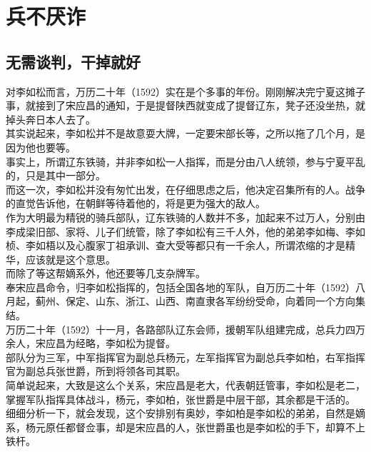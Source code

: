 \section{兵不厌诈}
\ifnum{}
	\begin{multicols}{\theparacolNo}
\fi
\subsection{无需谈判，干掉就好}
对李如松而言，万历二十年（1592）实在是个多事的年份。刚刚解决完宁夏这摊子事，就接到了宋应昌的通知，于是提督陕西就变成了提督辽东，凳子还没坐热，就掉头奔日本人去了。\\

其实说起来，李如松并不是故意耍大牌，一定要宋部长等，之所以拖了几个月，是因为他也要等。\\

事实上，所谓辽东铁骑，并非李如松一人指挥，而是分由八人统领，参与宁夏平乱的，只是其中一部分。\\

而这一次，李如松并没有匆忙出发，在仔细思虑之后，他决定召集所有的人。战争的直觉告诉他，在朝鲜等待着他的，将是更为强大的敌人。\\

作为大明最为精锐的骑兵部队，辽东铁骑的人数并不多，加起来不过万人，分别由李成梁旧部、家将、儿子们统管，除了李如松有三千人外，他的弟弟李如梅、李如桢、李如梧以及心腹家丁祖承训、查大受等都只有一千余人，所谓浓缩的才是精华，应该就是这个意思。\\

而除了等这帮嫡系外，他还要等几支杂牌军。\\

奉宋应昌命令，归李如松指挥的，包括全国各地的军队，自万历二十年（1592）八月起，蓟州、保定、山东、浙江、山西、南直隶各军纷纷受命，向着同一个方向集结。\\

万历二十年（1592）十一月，各路部队辽东会师，援朝军队组建完成，总兵力四万余人，宋应昌为经略，李如松为提督。\\

部队分为三军，中军指挥官为副总兵杨元，左军指挥官为副总兵李如柏，右军指挥官为副总兵张世爵，所到将领各司其职。\\

简单说起来，大致是这么个关系，宋应昌是老大，代表朝廷管事，李如松是老二，掌握军队指挥具体战斗，杨元，李如柏，张世爵是中层干部，其余都是干活的。\\

细细分析一下，就会发现，这个安排别有奥妙，李如柏是李如松的弟弟，自然是嫡系，杨元原任都督佥事，却是宋应昌的人，张世爵虽也是李如松的手下，却算不上铁杆。\\


\end{multicols}
